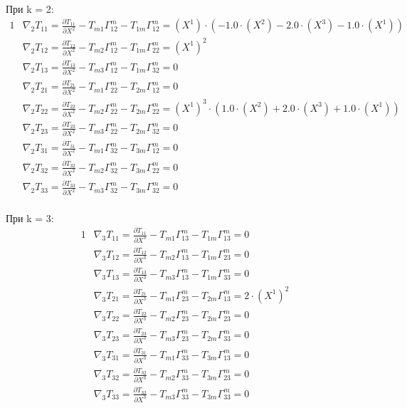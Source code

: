 \documentclass[a4paper, 12pt, oneside]{article}
\begin{document}
При k = 2:\\
\begin{alignat*}{1}
  & \nabla_2T_{11} = \frac{\partial T_{11}}{\partial X^2} - T_{m1}\Gamma^m_{12} - T_{1m}\Gamma^m_{12} = (X^1)\cdot (-1.0\cdot (X^2) - 2.0\cdot (X^3) - 1.0\cdot (X^1)) \\
  & \nabla_2T_{12} = \frac{\partial T_{12}}{\partial X^2} - T_{m2}\Gamma^m_{12} - T_{1m}\Gamma^m_{22} = (X^1)^2 \\
  & \nabla_2T_{13} = \frac{\partial T_{13}}{\partial X^2} - T_{m3}\Gamma^m_{12} - T_{1m}\Gamma^m_{32} = 0 \\
  & \nabla_2T_{21} = \frac{\partial T_{21}}{\partial X^2} - T_{m1}\Gamma^m_{22} - T_{2m}\Gamma^m_{12} = 0 \\
  & \nabla_2T_{22} = \frac{\partial T_{22}}{\partial X^2} - T_{m2}\Gamma^m_{22} - T_{2m}\Gamma^m_{22} = (X^1)^3\cdot (1.0\cdot (X^2) + 2.0\cdot (X^3) + 1.0\cdot (X^1)) \\
  & \nabla_2T_{23} = \frac{\partial T_{23}}{\partial X^2} - T_{m3}\Gamma^m_{22} - T_{2m}\Gamma^m_{32} = 0 \\
  & \nabla_2T_{31} = \frac{\partial T_{31}}{\partial X^2} - T_{m1}\Gamma^m_{32} - T_{3m}\Gamma^m_{12} = 0 \\
  & \nabla_2T_{32} = \frac{\partial T_{32}}{\partial X^2} - T_{m2}\Gamma^m_{32} - T_{3m}\Gamma^m_{22} = 0 \\
  & \nabla_2T_{33} = \frac{\partial T_{33}}{\partial X^2} - T_{m3}\Gamma^m_{32} - T_{3m}\Gamma^m_{32} = 0 
\end{alignat*}\\
При k = 3:\\
\begin{alignat*}{1}
  & \nabla_3T_{11} = \frac{\partial T_{11}}{\partial X^3} - T_{m1}\Gamma^m_{13} - T_{1m}\Gamma^m_{13} = 0 \\
  & \nabla_3T_{12} = \frac{\partial T_{12}}{\partial X^3} - T_{m2}\Gamma^m_{13} - T_{1m}\Gamma^m_{23} = 0 \\
  & \nabla_3T_{13} = \frac{\partial T_{13}}{\partial X^3} - T_{m3}\Gamma^m_{13} - T_{1m}\Gamma^m_{33} = 0 \\
  & \nabla_3T_{21} = \frac{\partial T_{21}}{\partial X^3} - T_{m1}\Gamma^m_{23} - T_{2m}\Gamma^m_{13} = 2\cdot (X^1)^2 \\
  & \nabla_3T_{22} = \frac{\partial T_{22}}{\partial X^3} - T_{m2}\Gamma^m_{23} - T_{2m}\Gamma^m_{23} = 0 \\
  & \nabla_3T_{23} = \frac{\partial T_{23}}{\partial X^3} - T_{m3}\Gamma^m_{23} - T_{2m}\Gamma^m_{33} = 0 \\
  & \nabla_3T_{31} = \frac{\partial T_{31}}{\partial X^3} - T_{m1}\Gamma^m_{33} - T_{3m}\Gamma^m_{13} = 0 \\
  & \nabla_3T_{32} = \frac{\partial T_{32}}{\partial X^3} - T_{m2}\Gamma^m_{33} - T_{3m}\Gamma^m_{23} = 0 \\
  & \nabla_3T_{33} = \frac{\partial T_{33}}{\partial X^3} - T_{m3}\Gamma^m_{33} - T_{3m}\Gamma^m_{33} = 0 
\end{alignat*}\\
\end{document}
